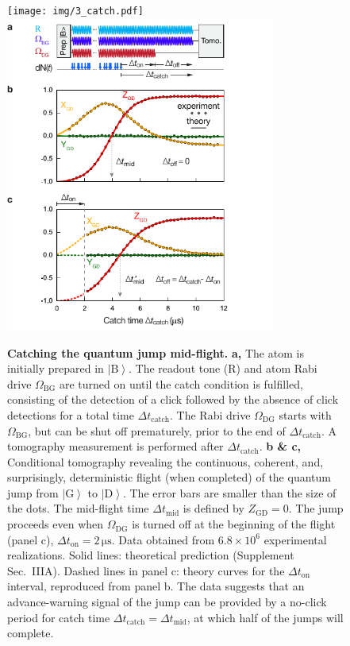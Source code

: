 \documentclass[
	 			preprint,     		superscriptaddress, 																longbibliography,
		amsmath, amssymb,
		aps,  prb,   		floatfix,
		linenumbers     
	]{revtex4-1}
\newcommand{\ket}[1]{\left|#1\right>}
\begin{document}
\begin{figure}
\begin{centering}
\ifjournal
	\texttt{[image: img/3\_catch.pdf]}
\else
	\includegraphics[width=89mm]{3_catch.pdf}
\fi
\caption{
\label{fig:catch} 
\textbf{Catching the quantum jump mid-flight.} 
\textbf{a,} 
The atom is initially prepared in $\ket{\mathrm B}$.
The readout tone ($\mathrm R$) and atom Rabi drive $\Omega_\mathrm{BG}$ are turned on until the catch condition is fulfilled, consisting of the detection of a click followed by the  absence of click detections for a total time $\Delta t_\mathrm{catch}$.
The Rabi drive $\Omega_\mathrm{DG}$ starts with $\Omega_\mathrm{BG}$, but can be shut off prematurely, prior to the end of $\Delta  t_\mathrm{catch}$.
A tomography measurement is performed after $\Delta t_\mathrm{catch}$. 
\textbf{b \& c,}
Conditional tomography revealing the continuous, coherent, and, surprisingly, deterministic flight (when completed) of the quantum jump from $\ket{\mathrm{G}}$ to $\ket{\mathrm{D}}$.
The error bars are smaller than the size of the dots.
The mid-flight time $\Delta  t_{\mathrm{mid}}$ is defined by $Z_\mathrm{GD}=0$.
The jump proceeds even when $\Omega_\mathrm{DG}$ is turned off at the beginning of the flight (panel c), $\Delta  t_\mathrm{on}= 2\,\mathrm{\mu s}$. 
Data obtained from $6.8\times10^{6}$ experimental realizations.
Solid lines: theoretical prediction (Supplement Sec.~IIIA).
Dashed lines in panel c: theory curves for the $\Delta  t_\mathrm{on}$ interval, reproduced from panel b.
The data suggests that an advance-warning signal of the jump can be provided by a no-click period for catch time $\Delta t_\mathrm{catch} = \Delta t_\mathrm{mid}$, at which half of the jumps will complete. }
\end{centering}
\end{figure}
\end{document}
